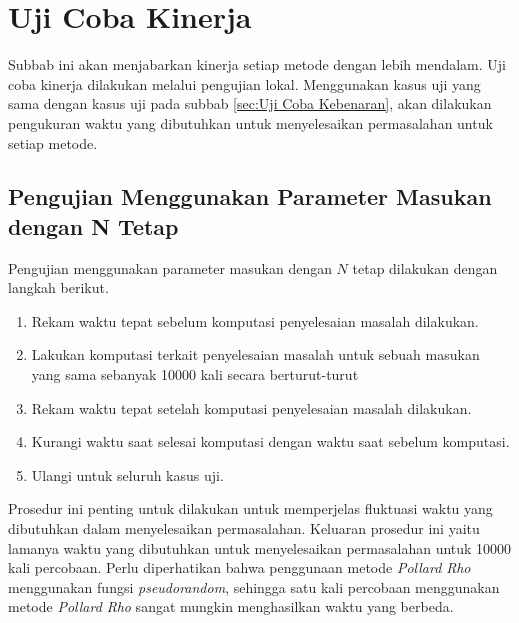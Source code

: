 \section{Uji Coba Kinerja}

Subbab ini akan menjabarkan kinerja setiap metode dengan lebih mendalam. Uji coba kinerja dilakukan melalui pengujian lokal. Menggunakan kasus uji yang sama dengan kasus uji pada subbab \ref{sec:Uji Coba Kebenaran}, akan dilakukan pengukuran waktu yang dibutuhkan untuk menyelesaikan permasalahan untuk setiap metode.

\subsection{Pengujian Menggunakan Parameter Masukan dengan N Tetap}

Pengujian menggunakan parameter masukan dengan $ N $ tetap dilakukan dengan langkah berikut.
\begin{enumerate}
	\item Rekam waktu tepat sebelum komputasi penyelesaian masalah dilakukan.
	\item Lakukan komputasi terkait penyelesaian masalah untuk sebuah masukan yang sama sebanyak 10000 kali secara berturut-turut
	\item Rekam waktu tepat setelah komputasi penyelesaian masalah dilakukan.
	\item Kurangi waktu saat selesai komputasi dengan waktu saat sebelum komputasi.
	\item Ulangi untuk seluruh kasus uji.
\end{enumerate}

Prosedur ini penting untuk dilakukan untuk memperjelas fluktuasi waktu yang dibutuhkan dalam menyelesaikan permasalahan. Keluaran prosedur ini yaitu lamanya waktu yang dibutuhkan untuk menyelesaikan permasalahan untuk 10000 kali percobaan. Perlu diperhatikan bahwa penggunaan metode \textit{Pollard Rho} menggunakan fungsi \textit{pseudorandom}, sehingga satu kali percobaan menggunakan metode \textit{Pollard Rho} sangat mungkin menghasilkan waktu yang berbeda.

